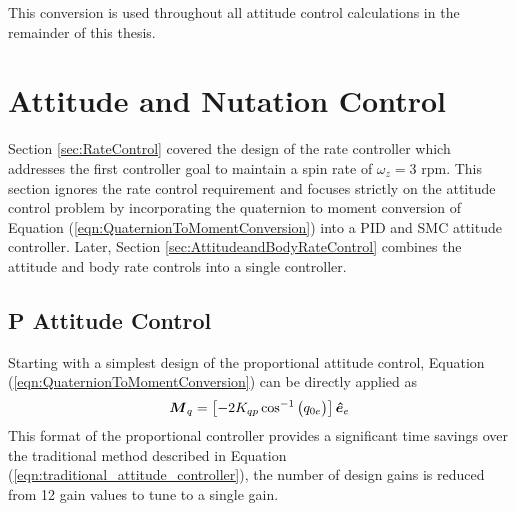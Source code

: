 This conversion is used throughout all attitude control calculations in the remainder of this thesis.








\section{Attitude and Nutation Control}
\label{sec:AttitudeAndNutationControl}

Section \ref{sec:RateControl} covered the design of the rate controller which addresses the first controller goal to maintain a spin rate of $\omega_z = 3$ rpm.  This section ignores the rate control requirement and focuses strictly on the attitude control problem by incorporating the quaternion to moment conversion of Equation (\ref{eqn:QuaternionToMomentConversion}) into a PID and SMC attitude controller.   Later, Section \ref{sec:AttitudeandBodyRateControl} combines the attitude and body rate controls into a single controller.

\subsection{P Attitude Control}
\label{subsec:PAttitudeControl}

Starting with a simplest design of the proportional attitude control, Equation (\ref{eqn:QuaternionToMomentConversion}) can be directly applied as
\begin{equation}
  \boldsymbol{M}_{q} = \left[- 2K_{qp} \cos^{-1} \big(q_{0e} \big) \right] \boldsymbol{\hat{e}}_e \\
  \label{eqn:PAttitudeControl}
\end{equation}
This format of the proportional controller provides a significant time savings over the traditional method described in Equation (\ref{eqn:traditional_attitude_controller}), the number of design gains is reduced from 12 gain values to tune to a single gain.


